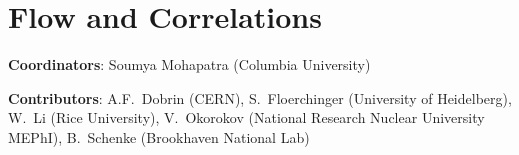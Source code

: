 \documentclass[../report.tex]{subfiles}
\providecommand{\main}{..}
\begin{document}
\section{Flow and Correlations}
\label{sec:flow}

{ \small
\noindent \textbf{Coordinators}: Soumya Mohapatra (Columbia University)

\noindent \textbf{Contributors}: 
A.F.~Dobrin (CERN), 
S.~Floerchinger (University of Heidelberg), 
W.~Li (Rice University), 
V.~Okorokov (National Research Nuclear University MEPhI), 
B.~Schenke (Brookhaven National Lab)
}

\FloatBarrier

\FloatBarrier
\FloatBarrier
\FloatBarrier
\FloatBarrier
\FloatBarrier
\FloatBarrier
\end{document}
